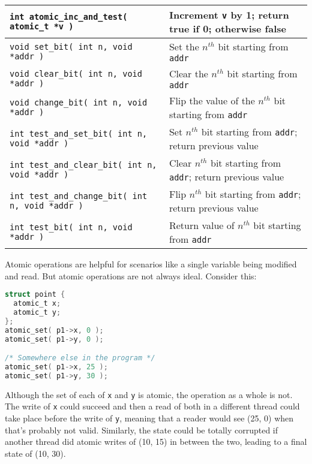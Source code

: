 \begin{center}
\begin{tabular}{l|l}
\texttt{int atomic\_inc\_and\_test( atomic\_t *v )} & Increment \texttt{v} by 1; return true if 0; otherwise false\\ \hline\hline

\texttt{void set\_bit( int n, void *addr )} &  Set the $n^{th}$ bit starting from \texttt{addr}\\\hline

\texttt{void clear\_bit( int n, void *addr )} &  Clear the $n^{th}$ bit starting from \texttt{addr}\\\hline

\texttt{void change\_bit( int n, void *addr )} &  Flip the value of the $n^{th}$ bit starting from \texttt{addr}\\\hline

\texttt{int test\_and\_set\_bit( int n, void *addr )} &  Set $n^{th}$ bit starting from \texttt{addr}; return previous value\\\hline

\texttt{int test\_and\_clear\_bit( int n, void *addr )} &  Clear $n^{th}$ bit starting from \texttt{addr}; return previous value\\\hline

\texttt{int test\_and\_change\_bit( int n, void *addr )} &  Flip $n^{th}$ bit starting from \texttt{addr}; return previous value\\\hline

\texttt{int test\_bit( int n, void *addr )} &  Return value of $n^{th}$ bit starting from \texttt{addr}\\\hline

\end{tabular}
\end{center}

Atomic operations are helpful for scenarios like a single variable being modified and read. But atomic operations are not always ideal. Consider this:

\begin{lstlisting}[language=C]
struct point {
  atomic_t x;
  atomic_t y;
};
atomic_set( p1->x, 0 );
atomic_set( p1->y, 0 );

/* Somewhere else in the program */
atomic_set( p1->x, 25 );
atomic_set( p1->y, 30 );
\end{lstlisting}

Although the set of each of \texttt{x} and \texttt{y} is atomic, the operation as a whole is not. The write of \texttt{x} could succeed and then a read of both in a different thread could take place before the write of \texttt{y}, meaning that a reader would see (25, 0) when that's probably not valid. Similarly, the state could be totally corrupted if another thread did atomic writes of (10, 15) in between the two, leading to a final state of (10, 30). 

